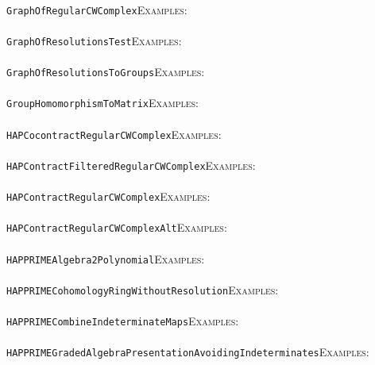 \documentclass[a4paper,11pt]{report}
\begin{document}
{{ \\
 \texttt{GraphOfRegularCWComplex}{\nobreakspace}{\nobreakspace}{\nobreakspace}{\nobreakspace}\textsc{Examples:} \\
 \\
 \texttt{GraphOfResolutionsTest}{\nobreakspace}{\nobreakspace}{\nobreakspace}{\nobreakspace}\textsc{Examples:} \\
 \\
 \texttt{GraphOfResolutionsToGroups}{\nobreakspace}{\nobreakspace}{\nobreakspace}{\nobreakspace}\textsc{Examples:} \\
 \\
 \texttt{GroupHomomorphismToMatrix}{\nobreakspace}{\nobreakspace}{\nobreakspace}{\nobreakspace}\textsc{Examples:} \\
 \\
 \texttt{HAPCocontractRegularCWComplex}{\nobreakspace}{\nobreakspace}{\nobreakspace}{\nobreakspace}\textsc{Examples:} \\
 \\
 \texttt{HAPContractFilteredRegularCWComplex}{\nobreakspace}{\nobreakspace}{\nobreakspace}{\nobreakspace}\textsc{Examples:} \\
 \\
 \texttt{HAPContractRegularCWComplex}{\nobreakspace}{\nobreakspace}{\nobreakspace}{\nobreakspace}\textsc{Examples:} \\
 \\
 \texttt{HAPContractRegularCWComplex{\textunderscore}Alt}{\nobreakspace}{\nobreakspace}{\nobreakspace}{\nobreakspace}\textsc{Examples:} \\
 \\
 \texttt{HAPPRIME{\textunderscore}Algebra2Polynomial}{\nobreakspace}{\nobreakspace}{\nobreakspace}{\nobreakspace}\textsc{Examples:} \\
 \\
 \texttt{HAPPRIME{\textunderscore}CohomologyRingWithoutResolution}{\nobreakspace}{\nobreakspace}{\nobreakspace}{\nobreakspace}\textsc{Examples:} \\
 \\
 \texttt{HAPPRIME{\textunderscore}CombineIndeterminateMaps}{\nobreakspace}{\nobreakspace}{\nobreakspace}{\nobreakspace}\textsc{Examples:} \\
 \\
 \texttt{HAPPRIME{\textunderscore}GradedAlgebraPresentationAvoidingIndeterminates}{\nobreakspace}{\nobreakspace}{\nobreakspace}{\nobreakspace}\textsc{Examples:} \\
 \\
}}
\end{document}
